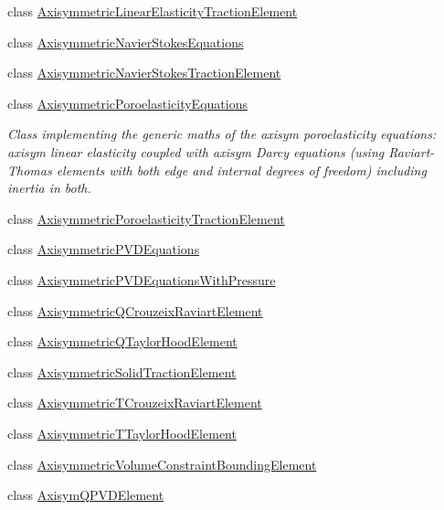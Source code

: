 \begin{DoxyCompactItemize}
\item 
class \hyperlink{classoomph_1_1AxisymmetricLinearElasticityTractionElement}{Axisymmetric\+Linear\+Elasticity\+Traction\+Element}
\item 
class \hyperlink{classoomph_1_1AxisymmetricNavierStokesEquations}{Axisymmetric\+Navier\+Stokes\+Equations}
\item 
class \hyperlink{classoomph_1_1AxisymmetricNavierStokesTractionElement}{Axisymmetric\+Navier\+Stokes\+Traction\+Element}
\item 
class \hyperlink{classoomph_1_1AxisymmetricPoroelasticityEquations}{Axisymmetric\+Poroelasticity\+Equations}
\begin{DoxyCompactList}\small\item\em Class implementing the generic maths of the axisym poroelasticity equations\+: axisym linear elasticity coupled with axisym Darcy equations (using Raviart-\/\+Thomas elements with both edge and internal degrees of freedom) including inertia in both. \end{DoxyCompactList}\item 
class \hyperlink{classoomph_1_1AxisymmetricPoroelasticityTractionElement}{Axisymmetric\+Poroelasticity\+Traction\+Element}
\item 
class \hyperlink{classoomph_1_1AxisymmetricPVDEquations}{Axisymmetric\+P\+V\+D\+Equations}
\item 
class \hyperlink{classoomph_1_1AxisymmetricPVDEquationsWithPressure}{Axisymmetric\+P\+V\+D\+Equations\+With\+Pressure}
\item 
class \hyperlink{classoomph_1_1AxisymmetricQCrouzeixRaviartElement}{Axisymmetric\+Q\+Crouzeix\+Raviart\+Element}
\item 
class \hyperlink{classoomph_1_1AxisymmetricQTaylorHoodElement}{Axisymmetric\+Q\+Taylor\+Hood\+Element}
\item 
class \hyperlink{classoomph_1_1AxisymmetricSolidTractionElement}{Axisymmetric\+Solid\+Traction\+Element}
\item 
class \hyperlink{classoomph_1_1AxisymmetricTCrouzeixRaviartElement}{Axisymmetric\+T\+Crouzeix\+Raviart\+Element}
\item 
class \hyperlink{classoomph_1_1AxisymmetricTTaylorHoodElement}{Axisymmetric\+T\+Taylor\+Hood\+Element}
\item 
class \hyperlink{classoomph_1_1AxisymmetricVolumeConstraintBoundingElement}{Axisymmetric\+Volume\+Constraint\+Bounding\+Element}
\item 
class \hyperlink{classoomph_1_1AxisymQPVDElement}{Axisym\+Q\+P\+V\+D\+Element}

\end{DoxyCompactItemize}
